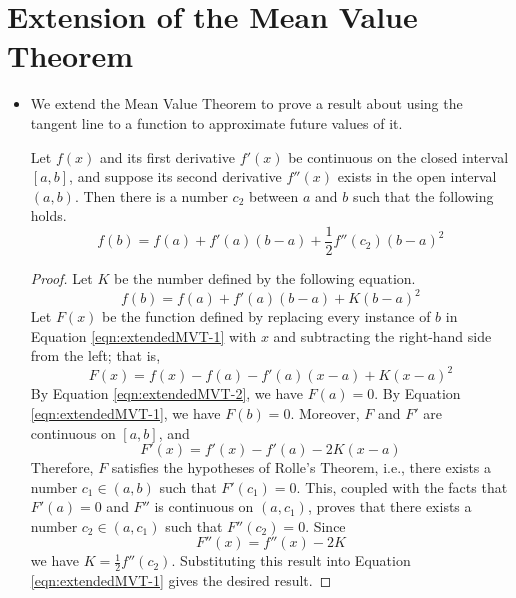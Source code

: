 \documentclass[../main.tex]{subfiles}
\begin{document}
\section{Extension of the Mean Value Theorem}
\begin{itemize}
    \item We extend the Mean Value Theorem to prove a result about using the tangent line to a function to approximate future values of it.
    \begin{thm}
        Let $f(x)$ and its first derivative $f'(x)$ be continuous on the closed interval $[a,b]$, and suppose its second derivative $f''(x)$ exists in the open interval $(a,b)$. Then there is a number $c_2$ between $a$ and $b$ such that the following holds.
        \begin{equation*}
            f(b) = f(a)+f'(a)(b-a)+\frac{1}{2}f''(c_2)(b-a)^2
        \end{equation*}
        \begin{proof}
            Let $K$ be the number defined by the following equation.
            \begin{equation}\label{eqn:extendedMVT-1}
                f(b) = f(a)+f'(a)(b-a)+K(b-a)^2
            \end{equation}
            Let $F(x)$ be the function defined by replacing every instance of $b$ in Equation \ref{eqn:extendedMVT-1} with $x$ and subtracting the right-hand side from the left; that is,
            \begin{equation}\label{eqn:extendedMVT-2}
                F(x) = f(x)-f(a)-f'(a)(x-a)+K(x-a)^2
            \end{equation}
            By Equation \ref{eqn:extendedMVT-2}, we have $F(a)=0$. By Equation \ref{eqn:extendedMVT-1}, we have $F(b)=0$. Moreover, $F$ and $F'$ are continuous on $[a,b]$, and
            \begin{equation*}
                F'(x) = f'(x)-f'(a)-2K(x-a)
            \end{equation*}
            Therefore, $F$ satisfies the hypotheses of Rolle's Theorem, i.e., there exists a number $c_1\in(a,b)$ such that $F'(c_1)=0$. This, coupled with the facts that $F'(a)=0$ and $F''$ is continuous on $(a,c_1)$, proves that there exists a number $c_2\in(a,c_1)$ such that $F''(c_2)=0$. Since
            \begin{equation*}
                F''(x) = f''(x)-2K
            \end{equation*}
            we have $K=\frac{1}{2}f''(c_2)$. Substituting this result into Equation \ref{eqn:extendedMVT-1} gives the desired result.

\end{proof}
\end{thm}
\end{itemize}
\end{document}
